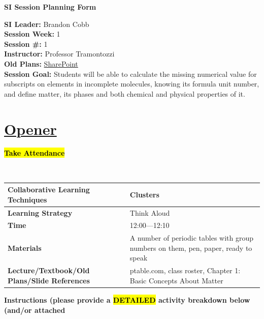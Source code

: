 \documentclass{article}
\begin{document}
\begin{center}
    {\LARGE \textbf{SI Session Planning Form}}
\end{center}

\vspace{0.5cm}

\noindent
\begin{flushleft}
\textbf{SI Leader:} Brandon Cobb \\
\textbf{Session Week:} 1 \\
\textbf{Session \#:} 1 \\
\textbf{Instructor:} Professor Tramontozzi \\
\textbf{Old Plans:} \href{https://macombedu.sharepoint.com/:b:/s/ASC-SupplementalInstructionEmbeddedTutoring/EeSYqCwT_KhMolgJvXbVEjgBOyF_DevvS8BgCm1zPkQQJg?e=QJTt4o}{SharePoint} \\
\textbf{Session Goal:} Students will be able to calculate the missing numerical value for subscripts on elements in incomplete molecules, knowing its formula unit number, and define matter, its phases and both chemical and physical properties of it.
\end{flushleft}

\vspace{1em}
\section*{\underline{Opener}}
{\centering\large\textbf{\hl{Take Attendance}}\par}\vspace{-0.25\baselineskip}

\\
\begin{tabular}{|p{4.2cm}|p{9.8cm}|}
\hline
\textbf{Collaborative Learning Techniques} & Clusters \\
\hline
\textbf{Learning Strategy} & Think Aloud \\
\hline
\textbf{Time} & 12:00---12:10 \\
\hline
\textbf{Materials} & A number of periodic tables with group numbers on them, pen, paper, ready to speak \\
\hline
\textbf{Lecture/Textbook/Old Plans/Slide References} & ptable.com, class roster, Chapter 1: Basic Concepts About Matter \\
\hline
\end{tabular}

\vspace{0.5cm}
\noindent
{\large \textbf{Instructions (please provide a \hl{DETAILED} activity breakdown below (and/or attached}} \\
\end{document}
